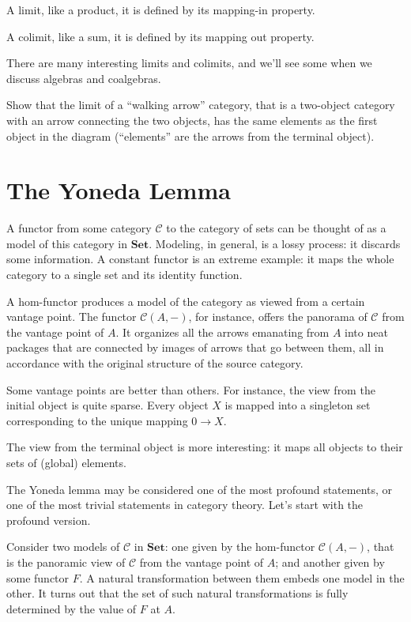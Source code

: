 \documentclass[DaoFP]{subfiles}
\begin{document}
A limit, like a product, it is defined by its mapping-in property. 

A colimit, like a sum, it is defined by its mapping out property.

There are many interesting limits and colimits, and we'll see some when we discuss algebras and coalgebras.

\begin{exercise}
Show that the limit of a ``walking arrow'' category, that is a two-object category with an arrow connecting the two objects, has the same elements as the first object in the diagram (``elements'' are the arrows from the terminal object).
\end{exercise}

\section{The Yoneda Lemma}

A functor from some category $\mathcal{C}$ to the category of sets can be thought of as a model of this category in $\mathbf{Set}$. Modeling, in general, is a lossy process: it discards some information. A constant functor is an extreme example: it maps the whole category to a single set and its identity function. 

A hom-functor produces a model of the category as viewed from a certain vantage point. The functor $\mathcal{C}(A, -)$, for instance, offers the panorama of $\mathcal{C}$ from the vantage point of $A$. It organizes all the arrows emanating from $A$ into neat packages that are connected by images of arrows that go between them, all in accordance with the original structure of the source category. 

Some vantage points are better than others. For instance, the view from the initial object is quite sparse. Every object $X$ is mapped into a singleton set corresponding to the unique mapping $0 \to X$. 

The view from the terminal object is more interesting: it maps all objects to their sets of (global) elements. 

The Yoneda lemma may be considered one of the most profound statements, or one of the most trivial statements in category theory. Let's start with the profound version. 

Consider two models of $\mathcal{C}$ in $\mathbf{Set}$: one given by the hom-functor  $\mathcal{C}(A, -)$, that is the panoramic view of $\mathcal{C}$ from the vantage point of $A$; and another given by some functor $F$. A natural transformation between them embeds one model in the other. It turns out that the set of such natural transformations is fully determined by the value of $F$ at $A$.
\end{document}
